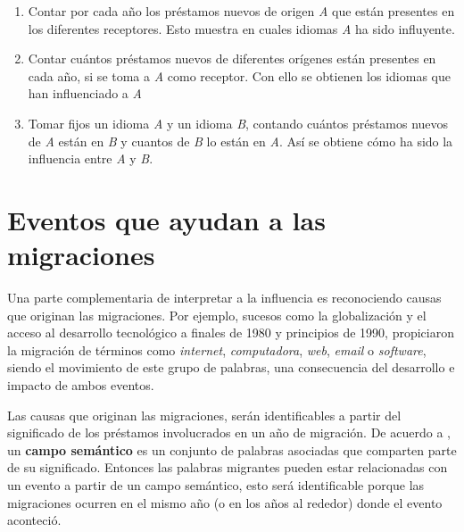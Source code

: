 \begin{enumerate}
	\label{proceso.nuevos}
	
\item Contar por cada año los préstamos nuevos de origen \textit{A} que están presentes en los diferentes receptores. Esto muestra en cuales idiomas \textit{A} ha sido influyente. 

\item Contar cuántos préstamos nuevos de diferentes orígenes están presentes en cada año, si se toma a \textit{A} como receptor. Con ello se obtienen los idiomas que han influenciado a \textit{A}




\item Tomar fijos un idioma \textit{A} y un idioma \textit{B}, contando cuántos préstamos nuevos de \textit{A} están en \textit{B} y cuantos de \textit{B} lo están en \textit{A}.  Así se obtiene cómo ha sido la influencia entre \textit{A} y \textit{B}.



\end{enumerate}


\section{Eventos que ayudan a las migraciones} %

Una parte complementaria de interpretar a la influencia es reconociendo causas
que originan las migraciones. Por ejemplo, sucesos como la globalización y el acceso al desarrollo tecnológico a finales de 1980 y principios de 1990, propiciaron la migración  de términos como \textit{internet}, \textit{computadora}, \textit{web}, \textit{email} o \textit{software}, siendo el movimiento de este grupo de palabras, una consecuencia del desarrollo e impacto de ambos eventos. 
 

Las causas que originan las migraciones, serán identificables a partir del significado de los préstamos involucrados en un año de migración. De acuerdo a \cite{mcgraw}, un  \textbf{campo semántico} es un conjunto de palabras asociadas que comparten parte de su significado. Entonces las palabras migrantes pueden estar relacionadas con un evento a partir de un campo semántico, esto será identificable porque las migraciones ocurren en el mismo año (o en los años al rededor) donde el evento aconteció. 

